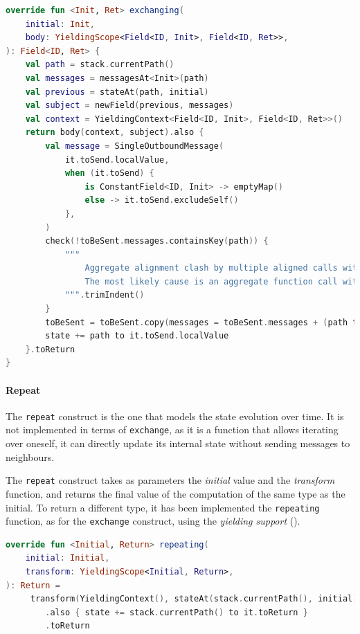 \begin{lstlisting}[language=kt,label={lst:exchanging},caption={The implementation of the \texttt{exchanging} function.}]
override fun <Init, Ret> exchanging(
    initial: Init,
    body: YieldingScope<Field<ID, Init>, Field<ID, Ret>>,
): Field<ID, Ret> {
    val path = stack.currentPath()
    val messages = messagesAt<Init>(path)
    val previous = stateAt(path, initial)
    val subject = newField(previous, messages)
    val context = YieldingContext<Field<ID, Init>, Field<ID, Ret>>()
    return body(context, subject).also {
        val message = SingleOutboundMessage(
            it.toSend.localValue,
            when (it.toSend) {
                is ConstantField<ID, Init> -> emptyMap()
                else -> it.toSend.excludeSelf()
            },
        )
        check(!toBeSent.messages.containsKey(path)) {
            """
                Aggregate alignment clash by multiple aligned calls with the same path: $path.
                The most likely cause is an aggregate function call within a loop
            """.trimIndent()
        }
        toBeSent = toBeSent.copy(messages = toBeSent.messages + (path to message))
        state += path to it.toSend.localValue
    }.toReturn
}
\end{lstlisting}

\paragraph{Repeat}
\label{par:repeating}
The \texttt{repeat} construct is the one that models the state evolution over time.
It is not implemented in terms of \texttt{exchange}, as it is a function that allows iterating over oneself,
it can directly update its internal state without sending messages to neighbours.

The \texttt{repeat} construct takes as parameters the \emph{initial} value and the \emph{transform} function, and returns the
final value of the computation of the same type as the initial.
To return a different type, it has been implemented the \texttt{repeating} function, as for the \texttt{exchange} construct,
using the \emph{yielding support} ().

\begin{lstlisting}[language=kt,label={lst:repeating},caption={The implementation of the \texttt{repeating} function.}]
 override fun <Initial, Return> repeating(
    initial: Initial,
    transform: YieldingScope<Initial, Return>,
): Return =
     transform(YieldingContext(), stateAt(stack.currentPath(), initial))
        .also { state += stack.currentPath() to it.toReturn }
        .toReturn
\end{lstlisting}

